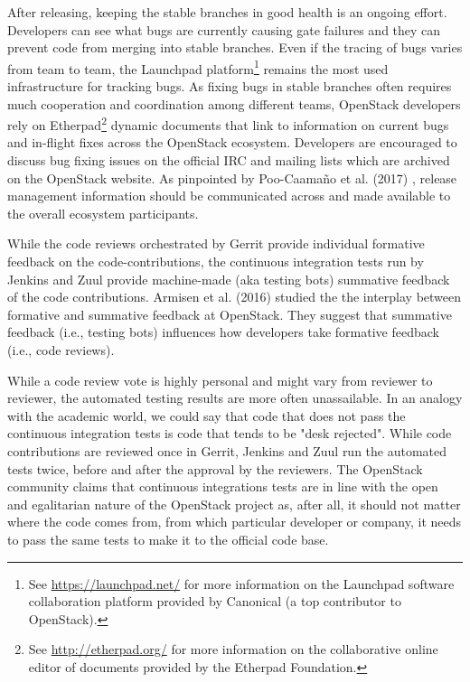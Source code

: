 \documentclass[dvipsnames]{bmcart}
\theoremstyle{definition}
\begin{document}
After releasing, keeping the stable branches in good health is an ongoing effort. Developers can see what bugs are currently causing gate failures and they can prevent code from merging into stable branches. Even if the tracing of bugs varies from team to team, the Launchpad platform\footnote{See \url{https://launchpad.net/} for more information on the Launchpad software collaboration platform provided by Canonical (a top contributor to OpenStack). } remains the most used infrastructure for tracking bugs. As fixing bugs in stable branches often requires much cooperation and coordination among different teams,  OpenStack developers rely on Etherpad\footnote{See \url{http://etherpad.org/} for more information on the collaborative online editor of documents provided by the  Etherpad Foundation.} dynamic documents that link to information on current bugs and in-flight fixes across the OpenStack ecosystem. Developers are encouraged to discuss bug fixing issues on the official IRC and mailing lists which are archived on the OpenStack website. As pinpointed by Poo-Caama{\~{n}}o et al. (2017)  \cite{Poo-Caamano2017}, release management information should be communicated across and made available to the overall ecosystem participants. 

While the code reviews orchestrated by Gerrit provide individual formative feedback on the code-contributions, the continuous integration tests run by Jenkins  and Zuul provide machine-made (aka testing bots) summative feedback of the code contributions. Armisen et al. (2016) \cite{armisen2016formative} studied the the interplay between formative and summative feedback at OpenStack. They suggest that summative feedback (i.e., testing bots) influences how developers take formative feedback (i.e., code reviews). 

While a code review vote is highly personal and might vary from reviewer to reviewer, the automated testing results are more often unassailable. In an analogy with the academic world, we could say that code that does not pass the continuous integration tests is code that tends to be "desk rejected". While code contributions are reviewed once in Gerrit, Jenkins and Zuul run the automated tests twice, before and after the approval by the reviewers.  The OpenStack community claims that continuous integrations tests are in line with the open and egalitarian nature of the OpenStack project as, after all, it should not matter where the code comes from, from which particular developer or company, it  needs to pass the same tests to make it to the official code base.
\end{document}
